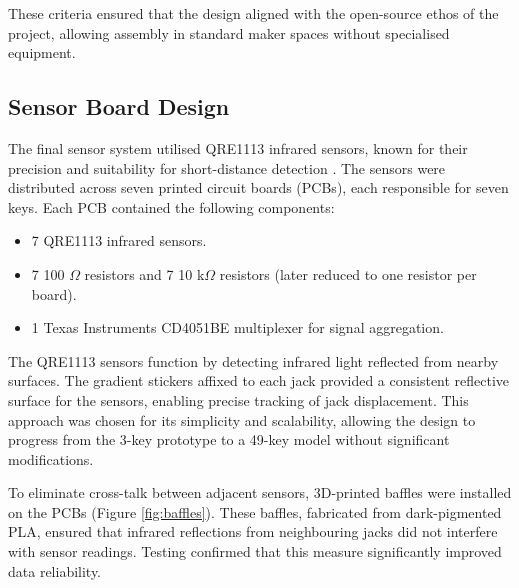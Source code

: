 These criteria ensured that the design aligned with the open-source ethos of the project, allowing assembly in standard maker spaces without specialised equipment. 

\subsection{Sensor Board Design}\label{sensor-board}


The final sensor system utilised QRE1113 infrared sensors, known for their precision and suitability for short-distance detection \cite{McPherson2013, McPherson2019}. The sensors were distributed across seven printed circuit boards (PCBs), each responsible for seven keys. Each PCB contained the following components:

\begin{itemize}
    \item 7 QRE1113 infrared sensors.
    \item 7 100 $\Omega$ resistors and 7 10 k$\Omega$ resistors (later reduced to one resistor per board).
    \item 1 Texas Instruments CD4051BE multiplexer for signal aggregation.
\end{itemize}

The QRE1113 sensors function by detecting infrared light reflected from nearby surfaces. The gradient stickers affixed to each jack provided a consistent reflective surface for the sensors, enabling precise tracking of jack displacement. This approach was chosen for its simplicity and scalability, allowing the design to progress from the 3-key prototype to a 49-key model without significant modifications.

To eliminate cross-talk between adjacent sensors, 3D-printed baffles were installed on the PCBs (Figure \ref{fig:baffles}). These baffles, fabricated from dark-pigmented PLA, ensured that infrared reflections from neighbouring jacks did not interfere with sensor readings. Testing confirmed that this measure significantly improved data reliability.

